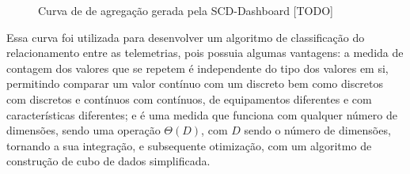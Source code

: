 \begin{figure}[ht]
	\caption{\color{red} Curva de de agregação gerada pela SCD-Dashboard [TODO]}
	\vspace{6mm}
	\begin{center}
	\end{center}
	\vspace{4mm}
	\legenda{}
	\label{fig:scdsimilaritygraph}
\end{figure}

Essa curva foi utilizada para desenvolver um algoritmo de classificação do relacionamento entre as telemetrias, pois possuia algumas vantagens: a medida de contagem dos valores que se repetem é independente do tipo dos valores em si, permitindo comparar um valor contínuo com um discreto bem como discretos com discretos e contínuos com contínuos, de equipamentos diferentes e com características diferentes; e é uma medida que funciona com qualquer número de dimensões, sendo uma operação $\Theta(D)$, com $D$ sendo o número de dimensões, tornando a sua integração, e subsequente otimização, com um algoritmo de construção de cubo de dados simplificada.

